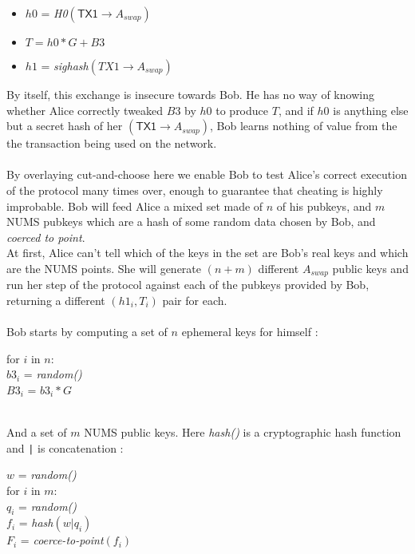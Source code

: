 \documentclass[12pt,a4paper]{article}
\begin{document}
\begin{footnotesize}
\begin{itemize}
\item $h0$ = \emph{H0}$(\textsf{TX1} \rightarrow A_{swap})$
\item $T = h0*G + B3$
\item $h1$ = \emph{sighash}$(TX1 \rightarrow A_{swap})$
\end{itemize}
\end{footnotesize}
By itself, this exchange is insecure towards Bob.  He has no way of knowing whether Alice correctly tweaked $B3$ by $h0$ to produce $T$, and if $h0$ is anything else but a secret hash of her $(\textsf{TX1} \rightarrow A_{swap})$, Bob learns nothing of value from the the transaction being used on the network.  \\ \\
By overlaying cut-and-choose here we enable Bob to test Alice's correct execution of the protocol many times over, enough to guarantee that cheating is highly improbable.  Bob will feed Alice a mixed set made of $n$ of his pubkeys, and $m$ NUMS pubkeys which are a hash of some random data chosen by Bob, and \emph{coerced to point}. \\
At first, Alice can't tell which of the keys in the set are Bob's real keys and which are the NUMS points.  She will generate $(n+m)$ different $A_{swap}$ public keys and run her step of the protocol against each of the pubkeys provided by Bob, returning a different $(h1_i, T_i)$ pair for each. \\ \\
Bob starts by computing a set of $n$ ephemeral keys for himself : \\
\begin{footnotesize}
for $i$ in $n$: \\
	\indent $b3_i$ = \emph{random()} \\
    \indent $B3_i$ = $b3_i * G$ \\
\end{footnotesize}
\\
And a set of $m$ NUMS public keys.  Here \emph{hash()} is a cryptographic hash function and \texttt{|} is concatenation : \\
\begin{footnotesize}
$w$ = \emph{random()} \\
for $i$ in $m$: \\
    \indent $q_i$ = \emph{random()} \\ 
    \indent $f_i$ = \emph{hash}$( w \texttt{|} q_i )$ \\
    \indent $F_i$ = \emph{coerce-to-point}$(f_i)$ \\
\end{footnotesize} \\
\end{document}
